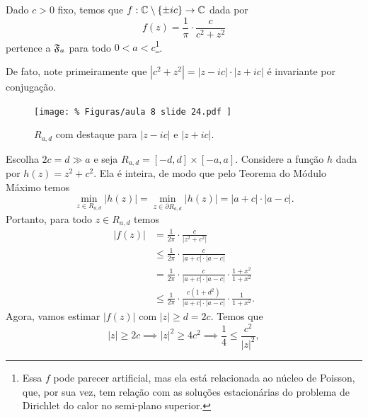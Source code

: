         \begin{exemplo}
            Dado $c>0$ fixo, temos que $f:\mathbb{C}\setminus\{\pm ic\}\to\mathbb{C}$ dada por
            \begin{equation*}
                f(z) = \frac{1}{\pi}\cdot\frac{c}{c^2 + z^2}
            \end{equation*}
            pertence a $\mathfrak{F}_a$ para todo $0 < a < c$\footnote{Essa $f$ pode parecer artificial,
            mas ela está relacionada ao núcleo de Poisson, que, por sua vez, tem relação com
            as soluções estacionárias do problema de Dirichlet do calor no semi-plano superior.}.
            
            De fato, note primeiramente que $|c^2+z^2| = |z-ic|\cdot |z+ic|$ é invariante por
            conjugação.
            \begin{figure}[H]\centering
                \texttt{[image: \%
                    Figuras/aula 8 slide 24.pdf
                ]}
                \caption{%
                    $R_{a,d}$ com destaque para $|z-ic|$ e $|z+ic|$.
                }
            \end{figure}
            Escolha $2c = d \gg a$ e seja $R_{a,d} = [-d,d]\times[-a,a]$.
            Considere a função $h$ dada por $h(z) = z^2 + c^2$. Ela é inteira, de modo que
            pelo Teorema do Módulo Máximo temos
            \begin{equation*}
                \min_{z\in R_{a,d}} |h(z)| = \min_{z\in\partial R_{a,d}} |h(z)| = |a+c|\cdot|a-c|.
            \end{equation*}
            Portanto, para todo $z\in R_{a,d}$ temos
            \begin{align*}
                |f(z)| &= \frac{1}{2\pi}\cdot\frac{c}{|z^2 + c^2|} \\
                       &\leq \frac{1}{2\pi}\cdot\frac{c}{|a+c|\cdot|a-c|} \\
                       &= \frac{1}{2\pi}\cdot\frac{c}{|a+c|\cdot|a-c|}\cdot\frac{1+x^2}{1+x^2} \\
                       &\leq\frac{1}{2\pi}\cdot\frac{c(1+d^2)}{|a+c|\cdot|a-c|}\cdot\frac{1}{1+x^2}.
            \end{align*}
            Agora, vamos estimar $|f(z)|$ com $|z|\geq d = 2c$. Temos que
            \begin{equation*}
                |z|\geq 2c \implies |z|^2 \geq 4c^2 \implies \frac{1}{4} \leq \frac{c^2}{|z|^2},

\end{equation*}
\end{exemplo}
